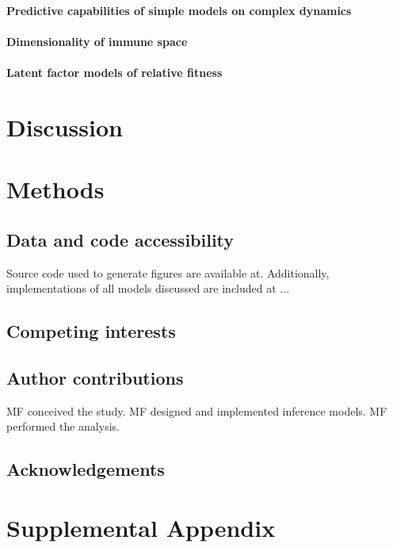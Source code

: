 \documentclass[12pt,oneside,letterpaper]{article}
\begin{document}
\paragraph{Predictive capabilities of simple models on complex dynamics}%

\paragraph{Dimensionality of immune space}%

\paragraph{Latent factor models of relative fitness}

\section*{Discussion}

\section*{Methods}

\subsection*{Data and code accessibility}

Source code used to generate figures are available at. 
Additionally, implementations of all models discussed are included at ...

\subsection*{Competing interests}%

\subsection*{Author contributions}
MF conceived the study. 
MF designed and implemented inference models. 
MF performed the analysis. 


\subsection*{Acknowledgements}%

\cite{Ito2021}




\newpage

\appendix

\setcounter{figure}{0}
\setcounter{table}{0}
\setcounter{page}{1}
\renewcommand{\thefigure}{S\arabic{figure}}
\renewcommand{\thetable}{S\arabic{table}}
\renewcommand{\thepage}{S\arabic{page}}

\section*{Supplemental Appendix}
\end{document}
